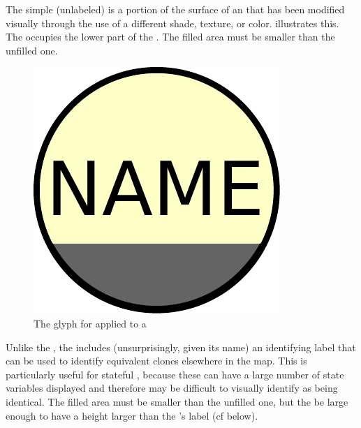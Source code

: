 The simple (unlabeled)  is a portion of the surface of an  that has been modified visually through the use of a different shade, texture, or color.   illustrates this. The  occupies the lower part of the . The filled area must be smaller than the unfilled one.

\begin{figure}[H]
  \centering
  \includegraphics[scale = 0.3]{le_images/simpleCloneMarker}
  \caption{The \PD glyph for  applied to a }
  \label{fig:simpleCloneMarker}
\end{figure}

Unlike the , the  includes (unsurprisingly, given its name) an identifying label that can be used to identify equivalent clones elsewhere in the map.  This is particularly useful for stateful , because these can have a large number of state variables displayed and therefore may be difficult to visually identify as being identical. The filled area must be smaller than the unfilled one, but the be large enough to have a height larger than the 's label (cf below).

